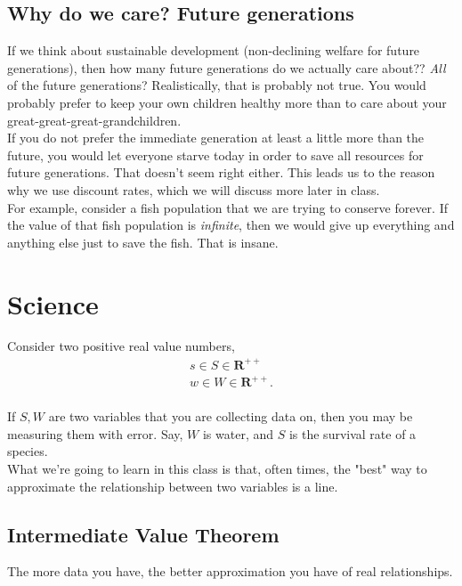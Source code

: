 \documentclass{article}
\begin{document}
\subsection{Why do we care? Future generations}
If we think about sustainable development (non-declining welfare for future generations), then how many future generations do we actually care about?? \textit{All} of the future generations? Realistically, that is probably not true. You would probably prefer to keep your own children healthy more than to care about your great-great-great-grandchildren.\\

If you do not prefer the immediate generation at least a little more than the future, you would let everyone starve today in order to save all resources for future generations. That doesn't seem right either. This leads us to the reason why we use discount rates, which we will discuss more later in class. \\

For example, consider a fish population that we are trying to conserve forever. If the value of that fish population is \textit{infinite}, then we would give up everything and anything else just to save the fish. That is insane. 

\section{Science}

Consider two positive real value numbers, 
\begin{align*}
    s \in S \in \mathbf{R}^{++}\\
    w \in W \in \mathbf{R}^{++}.\\
\end{align*}

If $S,W$ are two variables that you are collecting data on, then you may be measuring them with error. Say, $W$ is water, and $S$ is the survival rate of a species. \\

What we're going to learn in this class is that, often times, the "best" way to approximate the relationship between two variables is a line. 



\subsection{Intermediate Value Theorem}
The more data you have, the better approximation you have of real relationships.\\
\end{document}
